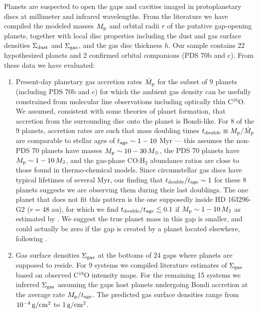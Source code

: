 \documentclass[fleqn,usenatbib]{mnras}
\newcommand{\Mearth}{M_{\oplus}}
\newcommand{\Mj}{M_{\rm J}}
\newcommand{\Sigg}{\Sigma_{\rm gas}}
\newcommand{\Sigd}{\Sigma_{\rm dust}}
\newcommand{\gcm}{\rm g/cm^2}
\begin{document}
Planets are suspected to open 
the gaps and cavities imaged in 
protoplanetary discs at
millimeter and infrared wavelengths.
From the literature we have compiled the modeled masses $M_{\rm p}$ and orbital radii $r$ of the
putative gap-opening planets, together with local disc properties 
including the dust and gas surface densities $\Sigd$ and $\Sigg$, and
the gas disc thickness $h$. Our sample contains 22
hypothesized planets and
2 confirmed orbital companions (PDS 70b and c). From these data we have evaluated:

\begin{enumerate}
\item Present-day planetary gas accretion rates $\dot{M}_{\rm p}$ 
for the subset of 9 planets (including PDS 70b and c) for which the ambient gas density can be usefully constrained from molecular line observations including optically thin C$^{18}$O. We assumed, consistent with some theories of planet formation, that accretion from the surrounding disc onto the planet is Bondi-like. 
For 8 of the 9 planets, accretion rates are such
that mass doubling times $t_{\rm double} \equiv M_{\rm p}/\dot{M}_{\rm p}$ 
are comparable to stellar ages of $t_{\rm age} \sim 1-10$ Myr --- this assumes the non-PDS 70 planets have masses $M_{\rm p} \sim 10-30 \,\Mearth$, the PDS 70 planets have $M_{\rm p} \sim 1-10\,\Mj$, and the gas-phase CO:H$_2$ abundance ratios are close to those found in  thermo-chemical models.
 Since circumstellar gas discs have typical lifetimes of several Myr, our finding that $t_{\rm double}/t_{\rm age} \sim 1$ for these 8 planets suggests we are observing them during their last doublings. The one planet that does not fit this pattern is the one supposedly inside HD 163296-G2 ($r = 48$ au), for which we find $t_{\rm double}/t_{\rm age} \lesssim 0.1$ if $M_{\rm p} \sim 1-10\,M_{\rm J}$ as estimated by \cite{zhang_etal_2018}. 
We suggest the true planet mass in this gap is smaller, and could actually be zero if the gap is created by a planet located elsewhere, following \citet{dong_etal_2018}.

\item Gas surface densities $\Sigg$ at the bottoms of 24 gaps where planets are supposed to reside. For 9 systems we compiled literature estimates of $\Sigg$ based on observed C$^{18}$O intensity maps. For the remaining 15 systems we inferred $\Sigg$ assuming the gaps host planets undergoing Bondi accretion at the average rate $M_{\rm p}/t_{\rm age}$. The predicted gas surface densities range from $10^{-4}\,\gcm$ to $1\,\gcm$.


\end{enumerate}
\end{document}
